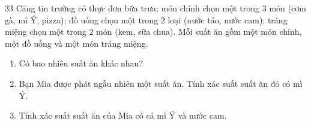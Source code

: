 \documentclass[11pt]{article}
\newenvironment{probbox}[2]{\begin{probboxT}{#1}{#2}}{\end{probboxT}}
\begin{document}
\begin{probbox}{33}{\relax}
Căng tin trường có thực đơn bữa trưa: món chính chọn một trong $3$ món (cơm gà, mì Ý, pizza); đồ uống chọn một trong $2$ loại (nước táo, nước cam); tráng miệng chọn một trong $2$ món (kem, sữa chua). Mỗi suất ăn gồm một món chính, một đồ uống và một món tráng miệng.
\begin{enumerate}[label=\alph*),leftmargin=1.5em,itemsep=0pt,topsep=2pt]
\item Có bao nhiêu suất ăn khác nhau?
\item Bạn Mia được phát ngẫu nhiên một suất ăn. Tính xác suất suất ăn đó có mì Ý.
\item Tính xác suất suất ăn của Mia có cả mì Ý và nước cam.
\end{enumerate}
\end{probbox}
\end{document}
